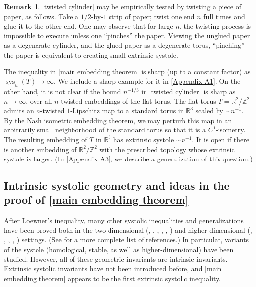 \documentclass[12pt]{amsart}
\DeclareMathOperator*{\sys}{sys}
\theoremstyle{definition}
\newtheorem{remark}[theorem]{Remark}
\begin{document}
\begin{remark} \cref{twisted cylinder} may be empirically tested by twisting a piece of paper, as follows. Take a $1/2$-by-$1$ strip of paper; twist one end $n$ full times and glue it to the other end. One may observe that for large $n$, the twisting process is impossible to execute unless one ``pinches'' the paper. Viewing the unglued paper as a degenerate cylinder, and the glued paper as a degenerate torus, ``pinching'' the paper is equivalent to creating small extrinsic systole. 
\end{remark}

The inequality in \cref{main embedding theorem} is sharp (up to a constant factor) as $\sys_u(T)\to \infty$. We include a sharp example for it in \cref{Appendix A1}. On the other hand, it is not clear if the bound $n^{-1/3}$ in \cref{twisted cylinder} is sharp as $n\to \infty$, over all $n$-twisted embeddings of the flat torus. The flat torus $T=\mathbb{R}^2/\mathbb{Z}^2$ admits an $n$-twisted $1$-Lipschitz map to a standard torus in $\mathbb{R}^3$ scaled by $\sim n^{-1}$. By the Nash isometric embedding theorem, we may perturb this map in an arbitrarily small neighborhood of the standard torus so that it is a $C^1$-isometry. The resulting embedding of $T$ in $\mathbb{R}^3$ has extrinsic systole $\sim n^{-1}$. It is open if there is another embedding of $\mathbb{R}^2/\mathbb{Z}^2$ with the prescribed topology whose extrinsic systole is larger. (In \cref{Appendix A3}, we describe a generalization of this question.)

\subsection{Intrinsic systolic geometry and ideas in the proof of \cref{main embedding theorem}} 
After Loewner's inequality, many other systolic inequalities and generalizations have been proved both in the two-dimensional (\cite{Pu52}, \cite{Bla61}, \cite{Bav86}, \cite{Gro96},  \cite{BS10}, \cite{BPS12}) and higher-dimensional (\cite{Gro83}, \cite{Gro99}, \cite{BK03}, \cite{BK04}, \cite{IK04}) settings. (See \cite{Kat07} for a more complete list of references.) In particular, variants of the systole (homological, stable, as well as higher-dimensional) have been studied. However, all of these geometric invariants are intrinsic invariants. Extrinsic systolic invariants have not been introduced before, and \cref{main embedding theorem} appears to be the first extrinsic systolic inequality.  
\end{document}
